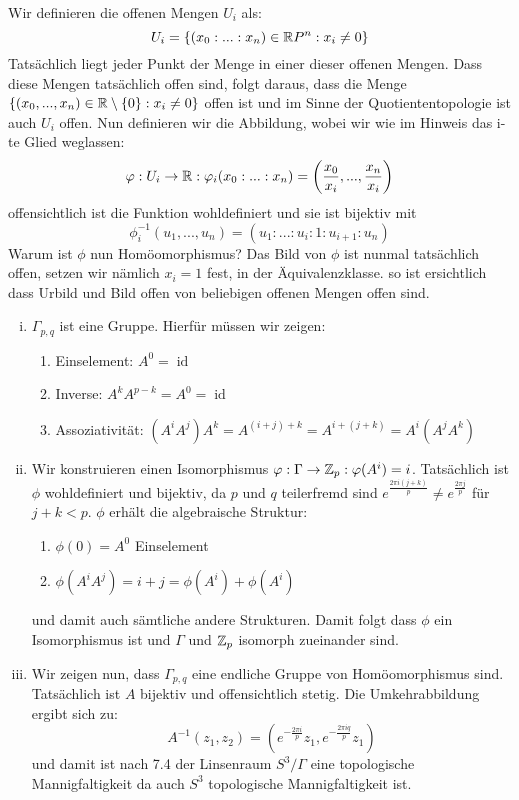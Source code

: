 \documentclass{scrartcl}
\newcommand{\id}{\operatorname{id}}
\begin{document}
\setcounter{section}{8}
\setcounter{aufgabe}{1}
\begin{aufgabe}
Wir definieren die offenen Mengen $ U_i $ als:
\[
U_i=\{(x_0:...:x_n)\in \mathbb{R} P^n: x_i \neq 0\}
\]
Tatsächlich liegt jeder Punkt der Menge in einer dieser offenen Mengen.  Dass diese Mengen tatsächlich offen sind,  folgt daraus, dass die Menge $ \{(x_0, ..., x_n) \in \mathbb{R}\setminus \{0\}: x_i\neq 0\} $ offen ist und im Sinne der Quotiententopologie ist auch $ U_i $ offen. Nun definieren wir die Abbildung, wobei wir wie im Hinweis das i-te Glied weglassen:
\[
\varphi: U_i \to \mathbb{R}: \varphi_i(x_0:...:x_n)=\left (\frac{x_0}{x_i},..., \frac{x_n}{x_i}\right ) 
\]  
offensichtlich ist die Funktion wohldefiniert und sie ist bijektiv mit
\[
\phi_i^{-1}(u_1,..., u_n)=(u_1:...:u_i: 1: u_{i+1}:u_n)
\]
Warum ist $ \phi $ nun Homöomorphismus?  Das Bild von $\phi$ ist nunmal tatsächlich offen, setzen wir nämlich  $ x_i=1 $ fest, in der Äquivalenzklasse. so ist ersichtlich dass Urbild und  Bild offen von beliebigen offenen Mengen offen sind.
\end{aufgabe}
\begin{aufgabe}
\begin{enumerate}[(i)]
\item $ \Gamma_{p,q} $ ist eine Gruppe. Hierfür müssen wir zeigen:
\begin{enumerate}[1)]
\item Einselement: $ A^0=\id $
\item Inverse: $ A^k A^{p-k}=A^0=\id $
\item Assoziativität: $ (A^iA^j)A^k=A^{(i+j)+k}=A^{i+(j+k)}=A^i(A^jA^k) $
\end{enumerate}
\item Wir konstruieren einen Isomorphismus $ \varphi: \Gamma \to \mathbb{Z}_p: \varphi(A^i)=i $.  Tatsächlich ist $ \phi $ wohldefiniert und bijektiv, da $ p $ und $ q $ teilerfremd sind $ e^{\frac{2\pi i (j+k)}{p}}\neq e^{\frac{2\pi j}{p}} $ für $ j+k<p $.  $ \phi $ erhält die algebraische Struktur:
\begin{enumerate}[1)]
\item $ \phi(0)=A^0 $ Einselement 
\item $ \phi(A^iA^j)=i+j=\phi(A^i)+\phi(A^i) $
\end{enumerate}
und damit auch sämtliche andere Strukturen.  Damit folgt dass $ \phi $ ein Isomorphismus ist und $ \Gamma $ und $ \mathbb{Z}_p $ isomorph zueinander sind.
\item Wir zeigen nun, dass $ \Gamma_{p,q} $ eine endliche Gruppe von Homöomorphismus sind. Tatsächlich ist $ A $ bijektiv und offensichtlich stetig.  Die Umkehrabbildung ergibt sich zu:
\[
A^{-1}(z_1, z_2)=(e^{-\frac{2\pi i}{p}} z_1, e^{-\frac{2\pi i q}{p}} z_1)
\]
und damit ist nach 7.4 der Linsenraum $S^3/\Gamma$ eine topologische Mannigfaltigkeit da auch $ S^3 $ topologische Mannigfaltigkeit ist. 
\end{enumerate}
\end{aufgabe}
\end{document}
